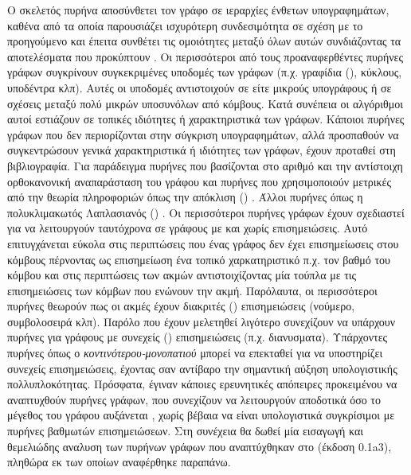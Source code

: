 Ο σκελετός πυρήνα  αποσύνθετει τον γράφο σε ιεραρχίες ένθετων υπογραφημάτων, καθένα από τα οποία παρουσιάζει ισχυρότερη συνδεσιμότητα σε σχέση με το προηγούμενο και έπειτα συνθέτει τις ομοιότητες μεταξύ όλων αυτών συνδιάζοντας τα αποτελέσματα που προκύπτουν \cite{nikolentzos2018}.
Οι περισσότεροι από τους προαναφερθέντες πυρήνες γράφων συγκρίνουν συγκεκριμένες υποδομές των γράφων (π.χ. γραφίδια (), κύκλους, υποδέντρα κλπ). Αυτές οι υποδομές αντιστοιχούν σε είτε μικρούς υπογράφους ή σε σχέσεις μεταξύ πολύ μικρών υποσυνόλων από κόμβους.
Κατά συνέπεια οι αλγόριθμοι αυτοί εστιάζουν σε τοπικές ιδιότητες ή χαρακτηριστικά των γράφων.
Κάποιοι πυρήνες γράφων που δεν περιορίζονται στην σύγκριση υπογραφημάτων, αλλά προσπαθούν να συγκεντρώσουν γενικά χαρακτηριστικά ή ιδιότητες των γράφων, έχουν προταθεί στη βιβλιογραφία.
Για παράδειγμα πυρήνες που βασίζονται στο αριθμό  και την αντίστοιχη ορθοκανονική αναπαράσταση του γράφου \cite{johansson2014global} και πυρήνες που χρησιμοποιούν μετρικές από την θεωρία πληροφοριών όπως την απόκλιση ()  \cite{Bai12}.
Άλλοι πυρήνες όπως η πολυκλιμακωτός Λαπλασιανός () \cite{kondor2016multiscale}.
Οι περισσότεροι πυρήνες γράφων έχουν σχεδιαστεί για να λειτουργούν ταυτόχρονα σε γράφους με και χωρίς επισημειώσεις.
Αυτό επιτυγχάνεται εύκολα στις περιπτώσεις που ένας γράφος δεν έχει επισημείωσεις στου κόμβους πέρνοντας ως επισημείωση ένα τοπικό χαρκατηριστικό π.χ. τον βαθμό του κόμβου και στις περιπτώσεις των ακμών αντιστοιχίζοντας μία τούπλα με τις επισημειώσεις των κόμβων που ενώνουν την ακμή.
Παρόλαυτα, οι περισσότεροι πυρήνες θεωρούν πως οι ακμές έχουν διακριτές () επισημειώσεις (νούμερο, συμβολοσειρά κλπ). Παρόλο που έχουν μελετηθεί λιγότερο συνεχίζουν να υπάρχουν πυρήνες για γράφους με συνεχείς () επισημειώσεις (π.χ. διανυσματα).
Υπάρχοντες πυρήνες όπως ο \textit{κοντινότερου-μονοπατιού} μπορεί να επεκταθεί για να υποστηρίζει συνεχείς επισημειώσεις, έχοντας σαν αντίβαρο την σημαντική αύξηση υπολογιστικής πολλυπλοκότητας. 
Πρόσφατα, έγιναν κάποιες ερευνητικές απόπειρες προκειμένου να αναπτυχθούν πυρήνες γράφων, που συνεχίζουν να λειτουργούν αποδοτικά όσο το μέγεθος του γράφου αυξάνεται \cite{Feragen13, Orsini2015, Morris16}, χωρίς βέβαια να είναι υπολογιστικά συγκρίσιμοι με πυρήνες βαθμωτών επισημειώσεων.
Στη συνέχεια θα δωθεί μία εισαγωγή και θεμελιώδης αναλυση των πυρήνων γράφων που αναπτύχθηκαν στο  (έκδοση 0.1a3), πληθώρα εκ των οποίων αναφέρθηκε παραπάνω.
